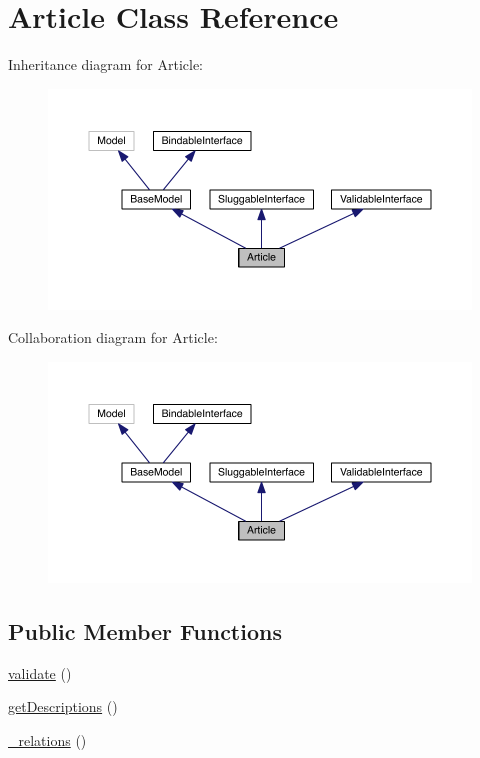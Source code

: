 \hypertarget{class_entity_1_1_article}{\section{Article Class Reference}
\label{class_entity_1_1_article}
}


Inheritance diagram for Article\-:
\nopagebreak
\begin{figure}[H]
\begin{center}
\leavevmode
\includegraphics[width=350pt]{class_entity_1_1_article__inherit__graph}
\end{center}
\end{figure}


Collaboration diagram for Article\-:
\nopagebreak
\begin{figure}[H]
\begin{center}
\leavevmode
\includegraphics[width=350pt]{class_entity_1_1_article__coll__graph}
\end{center}
\end{figure}
\subsection*{Public Member Functions}
\begin{DoxyCompactItemize}
\item 
\hyperlink{class_entity_1_1_article_a184909dab34698899937d810a9f5d393}{validate} ()
\item 
\hyperlink{class_entity_1_1_article_a9d650c6f0654a9b1861d05e05fa74476}{get\-Descriptions} ()
\item 
\hyperlink{class_entity_1_1_article_a55ae23613f7ee044582497c5d099dac6}{\-\_\-relations} ()
\end{DoxyCompactItemize}
